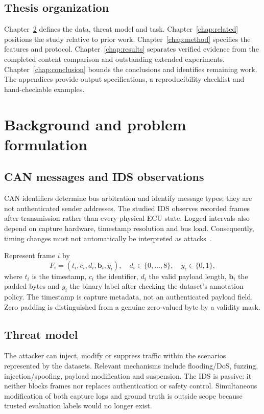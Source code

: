 \documentclass[12pt,a4paper,oneside,openany]{extbook}
\begin{document}
\section{Thesis organization}
Chapter~\ref{chap:background} defines the data, threat model and task. Chapter~\ref{chap:related} positions the study relative to prior work. Chapter~\ref{chap:method} specifies the features and protocol. Chapter~\ref{chap:results} separates verified evidence from the completed content comparison and outstanding extended experiments. Chapter~\ref{chap:conclusion} bounds the conclusions and identifies remaining work. The appendices provide output specifications, a reproducibility checklist and hand-checkable examples.

\chapter{Background and problem formulation}\label{chap:background}
\section{CAN messages and IDS observations}
CAN identifiers determine bus arbitration and identify message types; they are not authenticated sender addresses. The studied IDS observes recorded frames after transmission rather than every physical ECU state. Logged intervals also depend on capture hardware, timestamp resolution and bus load. Consequently, timing changes must not automatically be interpreted as attacks~\cite{bozdal2020evaluation,verma2024road}.

Represent frame $i$ by
\begin{equation}
F_i=(t_i,c_i,d_i,\mathbf{b}_i,y_i),\quad d_i\in\{0,\ldots,8\},\quad y_i\in\{0,1\},
\end{equation}
where $t_i$ is the timestamp, $c_i$ the identifier, $d_i$ the valid payload length, $\mathbf b_i$ the padded bytes and $y_i$ the binary label after checking the dataset's annotation policy. The timestamp is capture metadata, not an authenticated payload field. Zero padding is distinguished from a genuine zero-valued byte by a validity mask.

\section{Threat model}
The attacker can inject, modify or suppress traffic within the scenarios represented by the datasets. Relevant mechanisms include flooding/DoS, fuzzing, injection/spoofing, payload modification and suspension. The IDS is passive: it neither blocks frames nor replaces authentication or safety control. Simultaneous modification of both capture logs and ground truth is outside scope because trusted evaluation labels would no longer exist.
\end{document}
